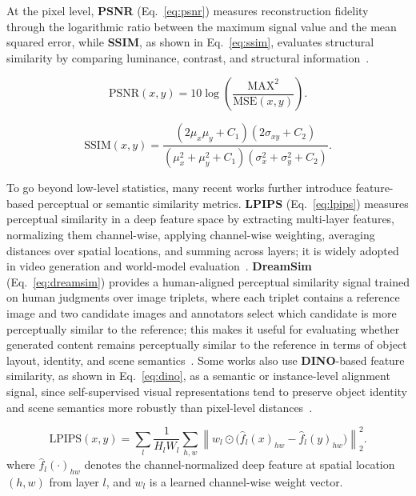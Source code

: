 At the pixel level, \textbf{PSNR} (Eq.~\ref{eq:psnr}) measures reconstruction fidelity through the logarithmic ratio between the maximum signal value and the mean squared error, while \textbf{SSIM}, as shown in Eq.~\ref{eq:ssim}, evaluates structural similarity by comparing luminance, contrast, and structural information~\citep{ssim}. 

\begin{equation}
\label{eq:psnr}
\mathrm{PSNR}(x,y)=10\log\left(\frac{\mathrm{MAX}^2}{\mathrm{MSE}(x,y)}\right).
\end{equation}

\begin{equation}
\label{eq:ssim}
\mathrm{SSIM}(x,y)=\frac{(2\mu_x\mu_y+C_1)(2\sigma_{xy}+C_2)}{(\mu_x^2+\mu_y^2+C_1)(\sigma_x^2+\sigma_y^2+C_2)}.
\end{equation}

To go beyond low-level statistics, many recent works further introduce feature-based perceptual or semantic similarity metrics. \textbf{LPIPS} (Eq.~\ref{eq:lpips}) measures perceptual similarity in a deep feature space by extracting multi-layer features, normalizing them channel-wise, applying channel-wise weighting, averaging distances over spatial locations, and summing across layers; it is widely adopted in video generation and world-model evaluation~\citep{lpips}. \textbf{DreamSim} (Eq.~\ref{eq:dreamsim}) provides a human-aligned perceptual similarity signal trained on human judgments over image triplets, where each triplet contains a reference image and two candidate images and annotators select which candidate is more perceptually similar to the reference; this makes it useful for evaluating whether generated content remains perceptually similar to the reference in terms of object layout, identity, and scene semantics~\citep{fu2023dreamsim}. Some works also use \textbf{DINO}-based feature similarity, as shown in Eq.~\ref{eq:dino}, as a semantic or instance-level alignment signal, since self-supervised visual representations tend to preserve object identity and scene semantics more robustly than pixel-level distances~\citep{oquab2023dinov2}.

\begin{equation}
\label{eq:lpips}
\mathrm{LPIPS}(x,y)
=
\sum_{l}
\frac{1}{H_l W_l}
\sum_{h,w}
\left\|
w_l \odot
\bigl(
\hat f_l(x)_{hw} - \hat f_l(y)_{hw}
\bigr)
\right\|_2^2.
\end{equation}
where $\hat f_l(\cdot)_{hw}$ denotes the channel-normalized deep feature at spatial location $(h,w)$ from layer $l$, and $w_l$ is a learned channel-wise weight vector.

